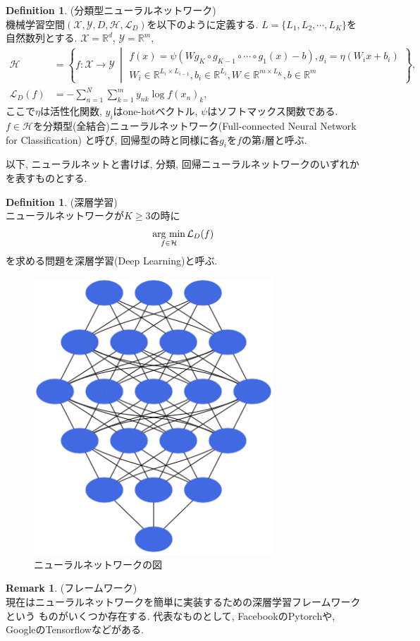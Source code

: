 \documentclass[11pt, a4paper, dvipdfmx]{jsarticle}
\theoremstyle{definition}
\newtheorem{Definition+}[Axiom+]{Definition}
\newtheorem{Remark+}[Axiom+]{Remark}
\newcommand{\R}{\mathbb{R}}
\newcommand{\X}{\mathcal{X}}
\newcommand{\Y}{\mathcal{Y}}
\newcommand{\Hil}{\mathcal{H}}
\newcommand{\Loss}{\mathcal{L}_{D}}
\newcommand{\MLsp}{(\X, \Y, D, \Hil, \Loss)}
\newcommand{\argmin}{\mathop{\rm arg~min}\limits}
\begin{document}
\begin{Definition+}(分類型ニューラルネットワーク)\\
    機械学習空間$\MLsp$を以下のように定義する. $L = \{L_{1}, L_{2}, \cdots, L_{K}\}$を自然数列とする.
    $\X = \R^d$, $\Y = \R^{m}$, 
    \begin{align*}
        \Hil &= \left\{f:\X\to\Y~\middle|
        \begin{array}{l}
            f(x) = \psi(W g_{K}\circ g_{K - 1}\circ\cdots\circ g_{1}(x) - b), g_{i} = \eta(W_{i}x + b_{i})\\
            W_{i}\in\R^{L_{i}\times L_{i - 1}}, b_{i}\in\R^{L_{i}}, W\in\R^{m\times L_{K}}, b\in\R^{m}
        \end{array}
        \right\},\\
        \Loss(f) &= -\sum_{n = 1}^{N}\sum_{k = 1}^{m}y_{nk}\log f(x_n)_{k},
    \end{align*}
    ここで$\eta$は活性化関数, $y_{i}$はone-hotベクトル, $\psi$はソフトマックス関数である. $f\in\Hil$を分類型(全結合)ニューラルネットワーク(Full-connected Neural Network for Classification)
    と呼び, 回帰型の時と同様に各$g_{i}$を$f$の第$i$層と呼ぶ.
\end{Definition+}
以下, ニューラルネットと書けば, 分類, 回帰ニューラルネットワークのいずれかを表すものとする. 
\begin{Definition+}(深層学習)\\
    ニューラルネットワークが$K \geq 3$の時に
    \begin{align*}
        \argmin_{f\in\Hil}\Loss(f)
    \end{align*}
    を求める問題を深層学習(Deep Learning)と呼ぶ.
\end{Definition+}
\begin{figure}[H]
    \centering
    \includegraphics[width = 9.0cm, angle=90]{Images/NN.png}
    \caption{ニューラルネットワークの図}
\end{figure}
\begin{Remark+}(フレームワーク)\\
    現在はニューラルネットワークを簡単に実装するための深層学習フレームワークという
    ものがいくつか存在する. 代表なものとして, FacebookのPytorchや, GoogleのTensorflowなどがある.
\end{Remark+}
\end{document}
